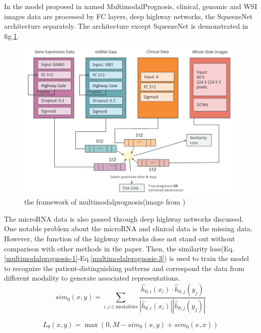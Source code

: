 \documentclass[journal,twoside,web]{ieeecolor}
\begin{document}
In the model proposed in \cite{cheerla2019deep} named MultimodalPrognosis, clinical, genomic and WSI images data are processed by FC layers, deep highway networks\cite{srivastava2015highway}, the SqueezeNet architecture\cite{iandola2016squeezenet} separately.
The architecture except SqueezeNet is demonstrated in fig.\ref{multimodalprognosis}.
\begin{figure}
    \centering
    \includegraphics[width=0.8\linewidth]{img/multimodalprognosis.png}
    \caption{the framework of multimodalprognosis(image from \cite{cheerla2019deep})}
    \label{multimodalprognosis}
\end{figure}
The microRNA data is also passed through deep highway networks discussed. 
One notable problem about the microRNA and clinical data is the missing data.
However, the function of the highway networks dose not stand out without comparison with other methods in the paper.
Then, the similarity loss(Eq.\ref{multimodalprognosis-1}-Eq.\ref{multimodalprognosis-3}) is used to train the model to recognize the patient-distinguishing patterns and correspond the data from different modality to generate associated representations. 
\begin{equation}\label{multimodalprognosis-1}
    sim_0(x,y)=\sum_{i,j\in\mathrm{mod}\text{alities}} \frac { \hat { h }_{0,i}(x_i)\cdot\hat{h}_{0,j}(y_j)}{|\hat{h}_{\theta,i}(x_i)||\hat{h}_{\theta,j}(y_j)|}
\end{equation}

\begin{equation}\label{multimodalprognosis-2}
    L_\theta(x,y)=\max(0,M-sim_0(x,y)+sim_0(x,x))
\end{equation}
\end{document}
